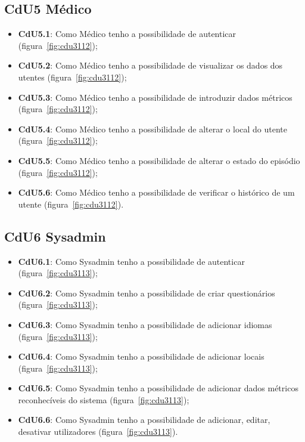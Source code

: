 \subsection{CdU5 Médico}
\begin{minipage}{\linewidth}
\begin{itemize}
	\item \textbf{CdU5.1}: Como Médico tenho a possibilidade de autenticar (figura~\ref{fig:cdu3112});
	\item \textbf{CdU5.2}: Como Médico tenho a possibilidade de visualizar os dados dos utentes (figura~\ref{fig:cdu3112});
	\item \textbf{CdU5.3}: Como Médico tenho a possibilidade de introduzir dados métricos (figura~\ref{fig:cdu3112});
	\item \textbf{CdU5.4}: Como Médico tenho a possibilidade de alterar o local do utente (figura~\ref{fig:cdu3112});
	\item \textbf{CdU5.5}: Como Médico tenho a possibilidade de alterar o estado do episódio (figura~\ref{fig:cdu3112});
	\item \textbf{CdU5.6}: Como Médico tenho a possibilidade de verificar o histórico de um utente (figura~\ref{fig:cdu3112}).
\end{itemize}
\end{minipage}
\newline

\subsection{CdU6 Sysadmin}
\begin{minipage}{\linewidth}
\begin{itemize}
	\item \textbf{CdU6.1}: Como Sysadmin tenho a possibilidade de autenticar (figura~\ref{fig:cdu3113});
	\item \textbf{CdU6.2}: Como Sysadmin tenho a possibilidade de criar questionários (figura~\ref{fig:cdu3113});
	\item \textbf{CdU6.3}: Como Sysadmin tenho a possibilidade de adicionar idiomas (figura~\ref{fig:cdu3113});
	\item \textbf{CdU6.4}: Como Sysadmin tenho a possibilidade de adicionar locais (figura~\ref{fig:cdu3113});
	\item \textbf{CdU6.5}: Como Sysadmin tenho a possibilidade de adicionar dados métricos reconhecíveis do sistema (figura~\ref{fig:cdu3113});
	\item \textbf{CdU6.6}: Como Sysadmin tenho a possibilidade de adicionar, editar, desativar utilizadores (figura~\ref{fig:cdu3113}).
\end{itemize}
\end{minipage}
\newline

